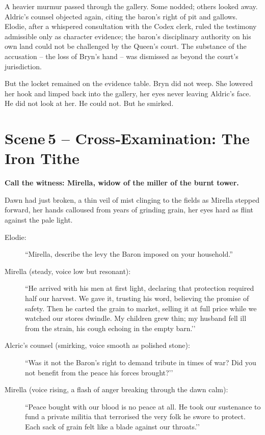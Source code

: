 \documentclass[11pt]{book}
\begin{document}
A heavier murmur passed through the gallery. Some nodded; others looked away. Aldric’s counsel objected again, citing the baron’s right of pit and gallows. Elodie, after a whispered consultation with the Codex clerk, ruled the testimony admissible only as character evidence; the baron’s disciplinary authority on his own land could not be challenged by the Queen’s court. The substance of the accusation – the loss of Bryn’s hand – was dismissed as beyond the court’s jurisdiction.

But the locket remained on the evidence table. Bryn did not weep. She lowered her hook and limped back into the gallery, her eyes never leaving Aldric’s face. He did not look at her. He could not. But he smirked.

\section*{Scene 5 – Cross‑Examination: The Iron Tithe}
\smallskip
\textbf{Call the witness: Mirella, widow of the miller of the burnt tower.}

Dawn had just broken, a thin veil of mist clinging to the fields as Mirella stepped forward, her hands calloused from years of grinding grain, her eyes hard as flint against the pale light.

\begin{description}
\item[Elodie:] ``Mirella, describe the levy the Baron imposed on your household.''
\item[Mirella (steady, voice low but resonant):] ``He arrived with his men at first light, declaring that protection required half our harvest. We gave it, trusting his word, believing the promise of safety. Then he carted the grain to market, selling it at full price while we watched our stores dwindle. My children grew thin; my husband fell ill from the strain, his cough echoing in the empty barn.’’
\item[Alcric’s counsel (smirking, voice smooth as polished stone):] ``Was it not the Baron’s right to demand tribute in times of war? Did you not benefit from the peace his forces brought?’’
\item[Mirella (voice rising, a flash of anger breaking through the dawn calm):] ``Peace bought with our blood is no peace at all. He took our sustenance to fund a private militia that terrorised the very folk he swore to protect. Each sack of grain felt like a blade against our throats.’’
\end{description}
\end{document}

